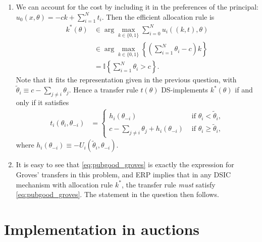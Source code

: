 \documentclass[a4paper]{article}
\begin{document}
\begin{enumerate}
	\item We can account for the cost by including it in the preferences of the principal: $u_0(x,\theta) = -c k + \sum_{i=1}^N t_i$. Then the efficient allocation rule is
	\begin{align*}
		k^*(\theta) 
		&\in \arg \max_{k \in \{0,1\}} \sum_{i=0}^N u_i((k,t),\theta)
		\\
		&\in \arg \max_{k \in \{0,1\}} \left\{\left(\sum_{i=1}^N \theta_i - c \right) k \right\}
		\\
		&= \mathbb{I} \left\{ \sum_{i=1}^N \theta_i > c \right\}.
	\end{align*}
	Note that it fits the representation given in the previous question, with $\tilde{\theta}_i \equiv c - \sum_{j\neq i} \theta_j$. Hence a transfer rule $t(\theta)$ DS-implements $k^*(\theta)$ if and only if it satisfies
	\begin{align} \label{eq:pubgood_groves}
		t_i(\theta_i, \theta_{-i}) 
		&= \begin{cases}
			h_i(\theta_{-i}) & \text{ if } \theta_i < \tilde{\theta}_i,
			\\
			c - \sum_{j\neq i} \theta_j + h_i(\theta_{-i}) & \text{ if } \theta_i \geq \tilde{\theta}_i,
		\end{cases}
	\end{align}
	where $h_i(\theta_{-i}) \equiv - U_i(\tilde{\theta}_i, \theta_{-i})$.
	
	\item It is easy to see that \eqref{eq:pubgood_groves} is exactly the expression for Groves' transfers in this problem, and ERP implies that in any DSIC mechanism with allocation rule $k^*$, the transfer rule \emph{must} satisfy \eqref{eq:pubgood_groves}. The statement in the question then follows.
\end{enumerate}
\fi 



\section{Implementation in auctions} \label{prb:implement_arb_k}
\end{document}
